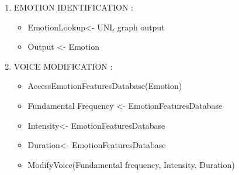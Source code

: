 \documentclass{article}
\begin{document}
\begin{enumerate}
\item EMOTION IDENTIFICATION :
\begin{itemize}
\item EmotionLookup<- UNL graph output
\item Output <- Emotion
\end{itemize}

\item VOICE MODIFICATION :
\begin{itemize}
\item AccessEmotionFeaturesDatabase(Emotion)
\item Fundamental Frequency <- EmotionFeaturesDatabase
\item Intensity<- EmotionFeaturesDatabase
\item Duration<- EmotionFeaturesDatabase
\item ModifyVoice(Fundamental frequency, Intensity, Duration)
\end{itemize}
\end{enumerate}
\end{document}
